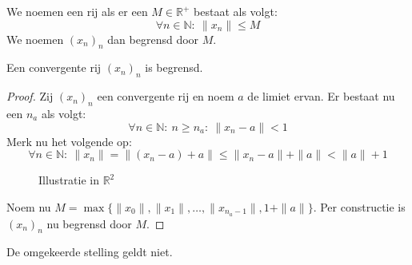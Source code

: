 \documentclass[main.tex]{subfiles}
\begin{document}
\begin{de}
  We noemen een rij  als er een $M \in \mathbb{R}^{+}$ bestaat als volgt:
  \[ \forall n \in \mathbb{N}:\ \|x_{n}\| \le M \]
  We noemen $(x_{n})_{n}$ dan begrensd door $M$.
\end{de}

\begin{st}
  Een convergente rij $(x_{n})_{n}$ is begrensd.

  \begin{proof}
    Zij $(x_{n})_{n}$ een convergente rij en noem $a$ de limiet ervan.
    Er bestaat nu een $n_{a}$ als volgt:
    \[ \forall n \in \mathbb{N}:\ n \ge n_{a}:\ \|x_{n}-a\| < 1 \]
    Merk nu het volgende op:
    \[ \forall n \in \mathbb{N}:\ \|x_{n}\| = \|(x_{n}-a) + a\| \le \|x_{n}-a\| + \|a\| < \|a\|+1 \]
    \begin{figure}[H]
      \centering
      \caption{Illustratie in $\mathbb{R}^{2}$}
    \end{figure}
    Noem nu $M = \max \{ \|x_{0}\|, \|x_{1}\|, \dotsc, \|x_{n_{a}-1}\|, 1+\|a\|\}$.
    Per constructie is $(x_{n})_{n}$ nu begrensd door $M$.
  \end{proof}
\end{st}

\begin{gst}
  De omgekeerde stelling geldt niet.
\end{gst}
\end{document}
